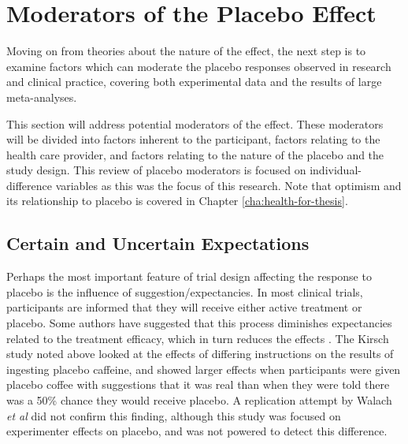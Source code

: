 

\section{Moderators of the Placebo Effect}
\label{sec:moder-plac-effect}

Moving on from theories about the nature of the effect, the next step is to examine factors which can moderate the placebo responses observed in research and clinical practice, covering both experimental data and the results of large meta-analyses. 


This section will address potential moderators of the effect.
These moderators will be divided into factors inherent to the participant, factors relating to the health care provider, and factors relating to the nature of the placebo and the study design. This review of placebo moderators is focused on individual-difference variables as this was the focus of this research. Note that optimism and its relationship to placebo is covered in Chapter \ref{cha:health-for-thesis}.


\subsection{Certain and Uncertain Expectations}
\label{sec:cert-uncert-expect}

Perhaps the most important feature of trial design affecting the response to placebo  is the influence of suggestion/expectancies. In most clinical trials, participants are informed that they will receive either active treatment or placebo. Some authors have suggested \cite{kirsch1988double}  that this process diminishes expectancies related to the treatment efficacy, which in turn reduces the effects \cite{Kleijnen1994}. The Kirsch study noted above looked at the effects of differing instructions on the results of ingesting placebo caffeine, and showed larger effects when participants were given placebo coffee with suggestions that it was real than when they were told there was a 50\% chance they would receive placebo. A replication attempt by Walach \textit{et al} did not confirm this finding, although this study was focused on experimenter effects on placebo, and was not powered to detect this difference. 

